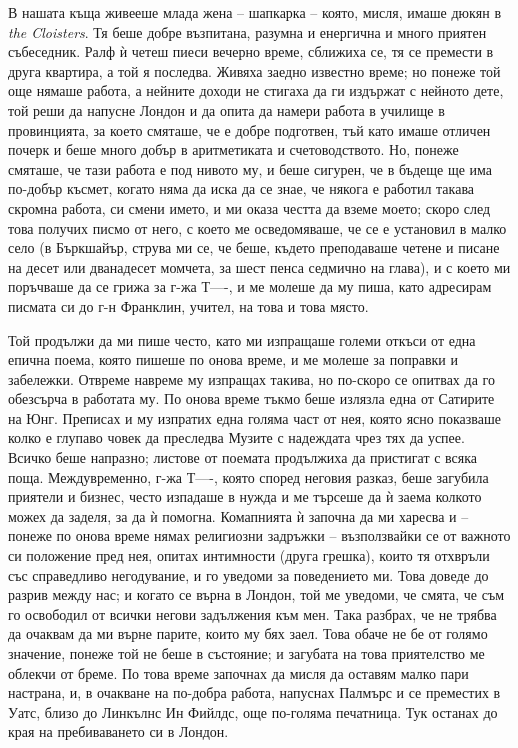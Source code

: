\documentclass[12pt]{book}
\begin{document}
В нашата къща живееше млада жена – шапкарка – която, мисля, имаше дюкян в \textit{the Cloisters}. Тя беше добре възпитана, разумна и енергична и много приятен събеседник. Ралф ѝ четеш пиеси вечерно време, сближиха се, тя се премести в друга квартира, а той я последва. Живяха заедно известно време; но понеже той още нямаше работа, а нейните доходи не стигаха да ги издържат с нейното дете, той реши да напусне Лондон и да опита да намери работа в училище в провинцията, за което смяташе, че е добре подготвен, тъй като имаше отличен почерк и беше много добър в аритметиката и счетоводството. Но, понеже смяташе, че тази работа е под нивото му, и беше сигурен, че в бъдеще ще има по-добър късмет, когато няма да иска да се знае, че някога е работил такава скромна работа, си смени името, и ми оказа честта да вземе моето; скоро след това получих писмо от него, с което ме осведомяваше, че се е установил в малко село (в Бъркшайър, струва ми се, че беше, където преподаваше четене и писане на десет или дванадесет момчета, за шест пенса седмично на глава), и с което ми поръчваше да се грижа за г-жа Т----, и ме молеше да му пиша, като адресирам писмата си до г-н Франклин, учител, на това и това място. 

Той продължи да ми пише често, като ми изпращаше големи откъси от една епична поема, която пишеше по онова време, и ме молеше за поправки и забележки. Отвреме навреме му изпращах такива, но по-скоро се опитвах да го обезсърча в работата му. По онова време тъкмо беше излязла една от Сатирите на Юнг. Преписах и му изпратих една голяма част от нея, която ясно показваше колко е глупаво човек да преследва Музите с надеждата чрез тях да успее. Всичко беше напразно; листове от поемата продължиха да пристигат с всяка поща. Междувременно, г-жа Т----, която според неговия разказ, беше загубила приятели и бизнес, често изпадаше в нужда и ме търсеше да ѝ заема колкото можех да заделя, за да ѝ помогна. Комапнията ѝ започна да ми харесва и – понеже по онова време нямах религиозни задръжки – възползвайки се от важното си положение пред нея, опитах интимности (друга грешка), които тя отхвръли със справедливо негодувание, и го уведоми за поведението ми. Това доведе до разрив между нас; и когато се върна в Лондон, той ме уведоми, че смята, че съм го освободил от всички негови задължения към мен. Така разбрах, че не трябва да очаквам да ми върне парите, които му бях заел. Това обаче не бе от голямо значение, понеже той не беше в състояние; и загубата на това приятелство ме облекчи от бреме. По това време започнах да мисля да оставям малко пари настрана, и, в очакване на по-добра работа, напуснах Палмърс и се преместих в Уатс, близо до Линкълнс Ин Фийлдс, още по-голяма печатница. Тук останах до края на пребиваването си в Лондон.
\end{document}
